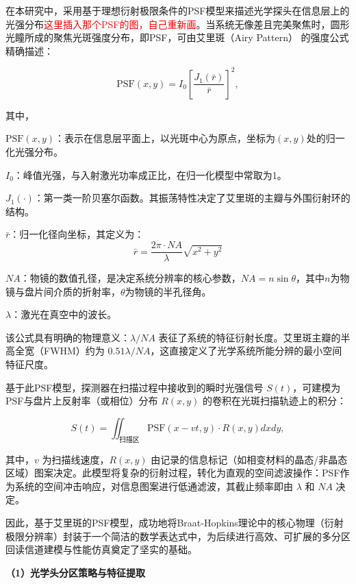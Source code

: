 在本研究中，采用基于理想衍射极限条件的PSF模型来描述光学探头在信息层上的光强分布\textcolor{red}{这里插入那个PSF的图，自己重新画}。当系统无像差且完美聚焦时，圆形光瞳所成的聚焦光斑强度分布，即PSF，可由艾里斑（Airy Pattern） 的强度公式精确描述：

\begin{equation}
	\text{PSF}(x, y) = I_0 \left[ \frac{J_1(\bar{r})}{\bar{r}} \right]^2, \label{eq.psf}
\end{equation}

其中，

$\text{PSF}(x, y)$：表示在信息层平面上，以光斑中心为原点，坐标为$(x, y)$处的归一化光强分布。

$I_0$：峰值光强，与入射激光功率成正比，在归一化模型中常取为1。

$J_1(\cdot)$：第一类一阶贝塞尔函数。其振荡特性决定了艾里斑的主瓣与外围衍射环的结构。

$\bar{r}$：归一化径向坐标，其定义为：
\begin{equation}
	\bar{r} = \frac{2\pi \cdot NA}{\lambda} \sqrt{x^2 + y^2}
\end{equation}

$NA$：物镜的数值孔径，是决定系统分辨率的核心参数，$NA = n \sin\theta$，其中$n$为物镜与盘片间介质的折射率，$\theta$为物镜的半孔径角。

$\lambda$：激光在真空中的波长。

该公式具有明确的物理意义：$\lambda/NA$ 表征了系统的特征衍射长度。艾里斑主瓣的半高全宽（FWHM）约为 $0.51\lambda/NA$，这直接定义了光学系统所能分辨的最小空间特征尺度。

基于此PSF模型，探测器在扫描过程中接收到的瞬时光强信号 $S(t)$，可建模为PSF与盘片上反射率（或相位）分布 $R(x, y)$ 的卷积在光斑扫描轨迹上的积分：

\begin{equation}
	S(t) = \iint_{\text{扫描区}} \text{PSF}(x - vt, y) \cdot R(x, y)  dxdy , \label{eq.st}
\end{equation}

其中，$v$ 为扫描线速度，$R(x, y)$ 由记录的信息标记（如相变材料的晶态/非晶态区域）图案决定。此模型将复杂的衍射过程，转化为直观的空间滤波操作：PSF作为系统的空间冲击响应，对信息图案进行低通滤波，其截止频率即由 $\lambda$ 和 $NA$ 决定。

因此，基于艾里斑的PSF模型，成功地将Braat-Hopkins理论中的核心物理（衍射极限分辨率）封装于一个简洁的数学表达式中，为后续进行高效、可扩展的多分区回读信道建模与性能仿真奠定了坚实的基础。

\textbf{（1）光学头分区策略与特征提取}

